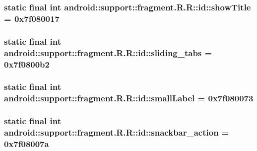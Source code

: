 \hypertarget{classandroid_1_1support_1_1fragment_1_1_r_1_1id_f449c5070283165abde76166c1889c01}{
\subsubsection[{showTitle}]{\setlength{\rightskip}{0pt plus 5cm}static final int android::support::fragment.R.R::id::showTitle = 0x7f080017}}
\label{classandroid_1_1support_1_1fragment_1_1_r_1_1id_f449c5070283165abde76166c1889c01}


\hypertarget{classandroid_1_1support_1_1fragment_1_1_r_1_1id_6e27a232d5db24649b9f424dd91380bc}{
\subsubsection[{sliding\_\-tabs}]{\setlength{\rightskip}{0pt plus 5cm}static final int android::support::fragment.R.R::id::sliding\_\-tabs = 0x7f0800b2}}
\label{classandroid_1_1support_1_1fragment_1_1_r_1_1id_6e27a232d5db24649b9f424dd91380bc}


\hypertarget{classandroid_1_1support_1_1fragment_1_1_r_1_1id_acf846982cbf72f8758c56b511f2410e}{
\subsubsection[{smallLabel}]{\setlength{\rightskip}{0pt plus 5cm}static final int android::support::fragment.R.R::id::smallLabel = 0x7f080073}}
\label{classandroid_1_1support_1_1fragment_1_1_r_1_1id_acf846982cbf72f8758c56b511f2410e}


\hypertarget{classandroid_1_1support_1_1fragment_1_1_r_1_1id_03ffd7b500a63fbaeeb4b8ffb9f65ba8}{
\subsubsection[{snackbar\_\-action}]{\setlength{\rightskip}{0pt plus 5cm}static final int android::support::fragment.R.R::id::snackbar\_\-action = 0x7f08007a}}
\label{classandroid_1_1support_1_1fragment_1_1_r_1_1id_03ffd7b500a63fbaeeb4b8ffb9f65ba8}


